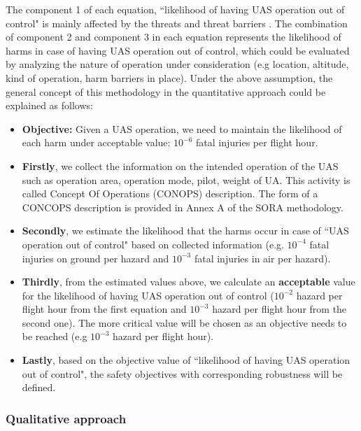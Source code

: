 \documentclass[a4paper, 10, conference]{ieeeconf}  %
\begin{document}
The component 1 of each equation, ``likelihood of having UAS operation out of control" is mainly affected by the threats and threat barriers \cite{SORAV1}. The combination of component 2 and component 3 in each equation represents the likelihood of harms in case of having UAS operation out of control, which could be evaluated by analyzing the nature of operation under consideration (e.g location, altitude, kind of operation, harm barriers in place). Under the above assumption, the general concept of this methodology in the quantitative approach could be explained as follows:
  \begin{itemize}
  	\item \textbf{Objective:} Given a UAS operation, we need to maintain the likelihood of each harm under acceptable value: $10^{-6}$ fatal injuries per flight hour.
  	\item \textbf{Firstly}, we collect the information on the intended operation of the UAS such as operation area, operation mode, pilot, weight of UA. This activity is called Concept Of Operations (CONOPS) description. The form of a CONCOPS description is provided in Annex A of the SORA methodology.
  	\item \textbf{Secondly}, we estimate the likelihood that the harms occur in case of ``UAS operation out of control" based on collected information (e.g. $10^{-4}$ fatal injuries on ground per hazard and $10^{-3}$ fatal injuries in air per hazard).
  	\item \textbf{Thirdly}, from the estimated values above, we calculate an \textbf{acceptable} value for the likelihood of having UAS operation out of control ($10^{-2}$ hazard per flight hour from the first equation and $10^{-3}$ hazard per flight hour from the second one). The more critical value will be chosen as an objective needs to be reached (e.g $10^{-3}$ hazard per flight hour).
  	\item \textbf{Lastly}, based on the objective value of ``likelihood of having UAS operation out of control", the safety objectives with corresponding robustness will be defined. 
  \end{itemize}


\subsubsection{Qualitative approach}
\end{document}
